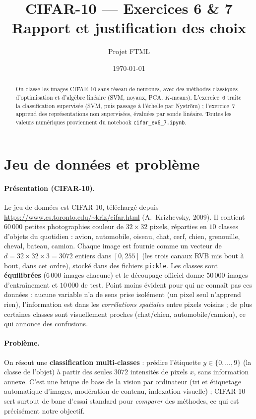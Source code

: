 \documentclass[11pt,a4paper]{article}
\title{\textbf{CIFAR-10 — Exercices 6 \& 7}\\[2pt]
\large Rapport et justification des choix}
\author{Projet FTML}
\date{\today}
\begin{document}
\maketitle
\vspace{-1.2em}

\begin{abstract}
\noindent On classe les images CIFAR-10 sans réseau de neurones, avec des
méthodes classiques d'optimisation et d'algèbre linéaire (SVM, noyaux, PCA,
$K$-means). L'exercice~6 traite la classification supervisée (SVM, puis passage à
l'échelle par Nyström) ; l'exercice~7 apprend des représentations non supervisées,
évaluées par sonde linéaire. Toutes les valeurs numériques proviennent du notebook
\texttt{cifar\_ex6\_7.ipynb}.
\end{abstract}

\section{Jeu de données et problème}
\paragraph{Présentation (CIFAR-10).} Le jeu de données est CIFAR-10, téléchargé
depuis \url{https://www.cs.toronto.edu/~kriz/cifar.html} (A.~Krizhevsky, 2009). Il
contient $60\,000$ petites photographies couleur de $32\times32$ pixels, réparties
en $10$ classes d'objets du quotidien : avion, automobile, oiseau, chat, cerf,
chien, grenouille, cheval, bateau, camion. Chaque image est fournie comme un
vecteur de $d=32\times32\times3=3072$ entiers dans $[0,255]$ (les trois canaux RVB
mis bout à bout, dans cet ordre), stocké dans des fichiers \texttt{pickle}. Les
classes sont \textbf{équilibrées} ($6\,000$ images chacune) et le découpage
officiel donne $50\,000$ images d'entraînement et $10\,000$ de test. Point moins
évident pour qui ne connaît pas ces données : aucune variable n'a de sens prise
isolément (un pixel seul n'apprend rien), l'information est dans les
\emph{corrélations spatiales} entre pixels voisins ; de plus certaines classes sont
visuellement proches (chat/chien, automobile/camion), ce qui annonce des confusions.

\paragraph{Problème.} On résout une \textbf{classification multi-classes} :
prédire l'étiquette $y\in\{0,\dots,9\}$ (la classe de l'objet) à partir des seules
$3072$ intensités de pixels $x$, sans information annexe. C'est une brique de base
de la vision par ordinateur (tri et étiquetage automatique d'images, modération de
contenu, indexation visuelle) ; CIFAR-10 sert surtout de banc d'essai standard pour
\emph{comparer} des méthodes, ce qui est précisément notre objectif.
\end{document}
